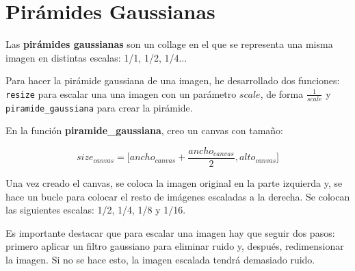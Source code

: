 \documentclass[11pt,a4paper]{article}
\theoremstyle{plain}
\theoremstyle{definition}
\begin{document}
\section{Pirámides Gaussianas}

Las \textbf{pirámides gaussianas} son un collage en el que se representa una misma imagen en distintas escalas: 1/1, 1/2, 1/4...

Para hacer la pirámide gaussiana de una imagen, he desarrollado dos funciones: \texttt{resize} para escalar una una imagen con un parámetro $scale$, de forma $\frac{1}{scale}$ y \texttt{piramide\_gaussiana} para crear la pirámide.

En la función \textbf{piramide\_gaussiana}, creo un canvas con tamaño:

\begin{displaymath}
size_{canvas} = \bigg [ ancho_{canvas} + \frac{ancho_{canvas}}{2}, alto_{canvas} \bigg ]
\end{displaymath}

Una vez creado el canvas, se coloca la imagen original en la parte izquierda y, se hace un bucle para colocar el resto de imágenes escaladas a la derecha. Se colocan las siguientes escalas: 1/2, 1/4, 1/8 y 1/16.

Es importante destacar que para escalar una imagen hay que seguir dos pasos: primero aplicar un filtro gaussiano para eliminar ruido y, después, redimensionar la imagen. Si no se hace esto, la imagen escalada tendrá demasiado ruido.
\end{document}
